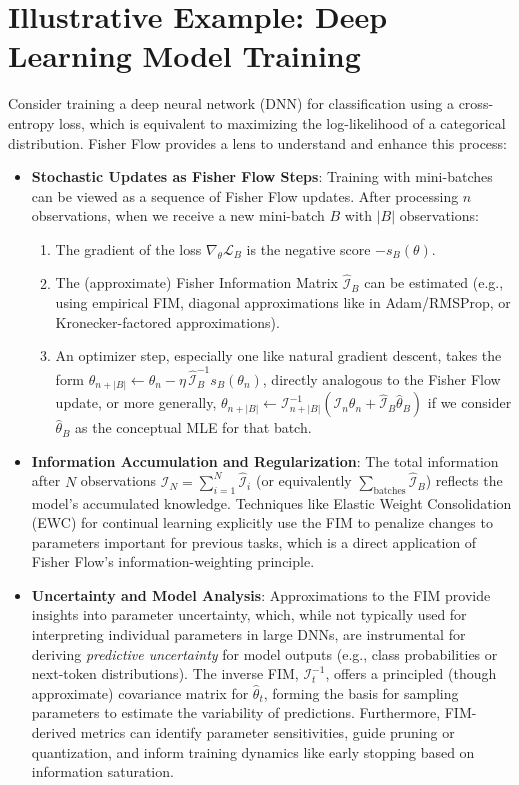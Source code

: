 \documentclass[11pt]{article}
\begin{document}
\section{Illustrative Example: Deep Learning Model Training}
Consider training a deep neural network (DNN) for classification using a cross-entropy loss, which is equivalent to maximizing the log-likelihood of a categorical distribution. Fisher Flow provides a lens to understand and enhance this process:

\begin{itemize}
  \item \textbf{Stochastic Updates as Fisher Flow Steps}: Training with mini-batches can be viewed as a sequence of Fisher Flow updates. After processing $n$ observations, when we receive a new mini-batch $B$ with $|B|$ observations:
  \begin{enumerate}
    \item The gradient of the loss $\nabla_\theta \mathcal{L}_{B}$ is the negative score $-s_{B}(\theta)$.
    \item The (approximate) Fisher Information Matrix $\hat{\mathcal{I}}_{B}$ can be estimated (e.g., using empirical FIM, diagonal approximations like in Adam/RMSProp, or Kronecker-factored approximations).
    \item An optimizer step, especially one like natural gradient descent, takes the form $\theta_{n+|B|} \leftarrow \theta_{n} - \eta \, \hat{\mathcal{I}}_{B}^{-1} s_{B}(\theta_{n})$, directly analogous to the Fisher Flow update, or more generally, $\theta_{n+|B|} \leftarrow \mathcal{I}_{n+|B|}^{-1}(\mathcal{I}_{n}\theta_{n} + \hat{\mathcal{I}}_{B}\hat\theta_{B})$ if we consider $\hat\theta_{B}$ as the conceptual MLE for that batch.
  \end{enumerate}
  \item \textbf{Information Accumulation and Regularization}: The total information after $N$ observations $\mathcal{I}_N = \sum_{i=1}^N \hat{\mathcal{I}}_i$ (or equivalently $\sum_{\text{batches}} \hat{\mathcal{I}}_{B}$) reflects the model's accumulated knowledge. Techniques like Elastic Weight Consolidation (EWC) \cite{kirkpatrick2017overcoming} for continual learning explicitly use the FIM to penalize changes to parameters important for previous tasks, which is a direct application of Fisher Flow's information-weighting principle.
  \item \textbf{Uncertainty and Model Analysis}: Approximations to the FIM provide insights into parameter uncertainty, which, while not typically used for interpreting individual parameters in large DNNs, are instrumental for deriving \textit{predictive uncertainty} for model outputs (e.g., class probabilities or next-token distributions). The inverse FIM, $\mathcal{I}_t^{-1}$, offers a principled (though approximate) covariance matrix for $\hat{\theta}_t$, forming the basis for sampling parameters to estimate the variability of predictions. Furthermore, FIM-derived metrics can identify parameter sensitivities, guide pruning or quantization, and inform training dynamics like early stopping based on information saturation.
\end{itemize}
\end{document}
